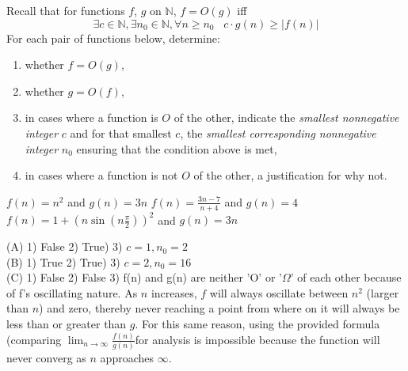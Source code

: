 \documentclass[solution,letterpaper]{cs20}
\begin{document}
\begin{problem}
Recall that for functions $f$, $g$ on $\mathbb{N}$, $f = O(g)$ iff
\[\exists c \in \mathbb{N}, \exists n_0 \in \mathbb{N}, \forall n \geq n_0\;\;\;c \cdot g(n) \geq |f(n)| \]
For each pair of functions below, determine:
\begin{enumerate}
\item whether $f = O(g)$,
\item whether $g = O(f)$,
\item in cases where a function is $O$ of the other, indicate the \emph{smallest
nonnegative integer} $c$ and for that smallest $c$, the \emph{smallest
corresponding nonnegative integer} $n_0$ ensuring that the condition above is met,
\item in cases where a function is not $O$ of the other, a justification for why
not.
\end{enumerate}
\subproblem $f(n) = n^2$ and $g(n) = 3n$
\subproblem $f(n) = \frac{3n-7}{n + 4}$ and $g(n) = 4$
\subproblem $f(n) = 1 + (n\sin(n\frac{\pi}{2}))^2$ and $g(n) = 3n$ \\
\begin{solution}
(A)  1) False 2) True) 3) $c=1,  n_0 = 2$ \\
(B)  1) True 2) True) 3) $c=2, n_0 = 16$ \\
(C)  1) False 2) False 3) f(n) and g(n) are neither 'O' or '$\Omega$' of each other because of f's oscillating nature. As $n$ increases, $f$ will always oscillate between $n^2$ (larger than $n$) and zero, thereby never reaching a point from where on it will always be less than or greater than $g$. For this same reason, using the provided formula (comparing $\lim_{n \to \infty}{\frac{f(n)}{g(n)}}$for analysis is impossible because the function will never converg as $n$ approaches $\infty$.

\end{solution}
\end{problem}
\newpage
\end{document}
